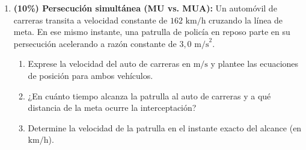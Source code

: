 \documentclass[11pt, letterpaper]{article}
\newif\ifmostrarrespuestas
\newcommand{\respuesta}[1]{
	\ifmostrarrespuestas
	\par\vspace{0.2cm}
	\begin{tcolorbox}[colback=blue!5!white, colframe=valblue, coltext=blue!80!black, boxrule=0.5pt, arc=1mm, left=2mm, right=2mm, top=1.5mm, bottom=1.5mm]
		\footnotesize \textbf{\textcolor{valblue}{Solución Paso a Paso (Docente):}} #1
	\end{tcolorbox}
	\vspace{0.2cm}
	\fi
}
\begin{document}
\begin{enumerate}[leftmargin=*, itemsep=0.6cm]
		\item \textbf{(10\%) Persecución simultánea (MU vs. MUA):} Un automóvil de carreras transita a velocidad constante de $162\text{ km/h}$ cruzando la línea de meta. En ese mismo instante, una patrulla de policía en reposo parte en su persecución acelerando a razón constante de $3,0\text{ m/s}^2$.
		\begin{enumerate}[label=\alph*., itemsep=0.2cm]
			\item Exprese la velocidad del auto de carreras en $\text{m/s}$ y plantee las ecuaciones de posición para ambos vehículos.
			\item ¿En cuánto tiempo alcanza la patrulla al auto de carreras y a qué distancia de la meta ocurre la interceptación?
			\item Determine la velocidad de la patrulla en el instante exacto del alcance (en $\text{km/h}$).
		\end{enumerate}
		\respuesta{
			\textbf{a)} $v_i = 162\text{ km/h} = \mathbf{45}\text{ \textbf{m/s}}$. Ecuación del auto ($\text{MU}$): $x_i(t) = 45 t$.\\
			Ecuación de la patrulla ($\text{MUA}$): $x_p(t) = \frac{1}{2}(3,0) t^2 = 1,5 t^2$.\\[0.1cm]
			\textbf{b)} Igualando $x_i = x_p \implies 45 t = 1,5 t^2 \implies t = \frac{45}{1,5} = \mathbf{30}\text{ \textbf{s}}$.\\
			Distancia de interceptación: $x = 45(30) = \mathbf{1350}\text{ \textbf{m}}$.\\[0.1cm]
			\textbf{c)} Velocidad de la patrulla: $v_p = 3,0 \cdot 30 = \mathbf{90}\text{ \textbf{m/s}} = 90 \times 3,6 = \mathbf{324}\text{ \textbf{km/h}}$.
		}
		

\end{enumerate}
\end{document}
